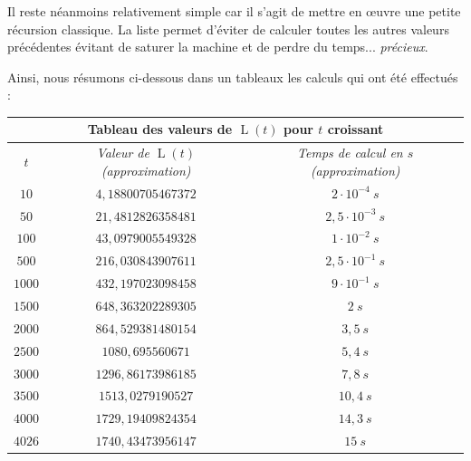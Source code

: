 \documentclass[a4paper,francais,11pt]{article}
\begin{document}
Il reste néanmoins relativement simple car il s'agit de mettre en œuvre une petite récursion classique. La liste permet d'éviter de calculer toutes les autres valeurs précédentes évitant de saturer la machine et de perdre du temps... \emph{précieux}.

Ainsi, nous résumons ci-dessous dans un tableaux les calculs qui ont été effectués :
\begin{center}
\begin{tabular}{|c||c|c|}
    \hline
    \multicolumn{3}{|c|}{\textbf{Tableau des valeurs de $\operatorname{L}\left(t\right)$ pour $t$ croissant}} \\ \hline\hline
        \multirow{1}{*}{\emph{$t$}} & \emph{Valeur de $\operatorname{L}\left(t\right)$ (approximation)} & \emph{Temps de calcul en $s$ (approximation)} \\ \hline\hline
        \multirow{1}{*}{$10$} & $4{,}18800705467372$ & $2\cdot10^{-4}\ s$ \\ \hline
        \multirow{1}{*}{$50$} & $21{,}4812826358481$ & $2{,}5\cdot10^{-3}\ s$ \\ \hline
        \multirow{1}{*}{$100$} & $43{,}0979005549328$ & $1\cdot10^{-2}\ s$ \\ \hline
        \multirow{1}{*}{$500$} & $216{,}030843907611$ & $2{,}5\cdot10^{-1}\ s$ \\ \hline
        \multirow{1}{*}{$1000$} & $432{,}197023098458$ & $9\cdot10^{-1}\ s$ \\ \hline
        \multirow{1}{*}{$1500$} & $648{,}363202289305$ & $2\ s$ \\ \hline
        \multirow{1}{*}{$2000$} & $864{,}529381480154$ & $3{,}5\ s$ \\ \hline
        \multirow{1}{*}{$2500$} & $1080{,}695560671$ & $5{,}4\ s$ \\ \hline
        \multirow{1}{*}{$3000$} & $1296{,}86173986185$ & $7{,}8\ s$ \\ \hline
        \multirow{1}{*}{$3500$} & $1513{,}0279190527$ & $10{,}4\ s$ \\ \hline
        \multirow{1}{*}{$4000$} & $1729{,}19409824354$ & $14{,}3\ s$ \\ \hline
        \multirow{1}{*}{$4026$} & $1740{,}43473956147$ & $15\ s$ \\
    \hline
\end{tabular}
\end{center}
\end{document}
